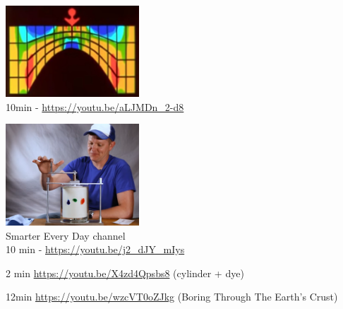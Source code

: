 
\begin{center}
\includegraphics[width=5cm]{images/youtube/superold}\\
10min - \url{https://youtu.be/aLJMDn_2-d8}
\end{center}

\begin{center}
\includegraphics[width=5cm]{images/youtube/smarter}\\
Smarter Every Day channel\\
10 min - \url{https://youtu.be/j2_dJY_mIys}
\end{center}


2 min \url{https://youtu.be/X4zd4Qpsbs8} (cylinder + dye)

12min \url{https://youtu.be/wzcVT0oZJkg} (Boring Through The Earth's Crust)

